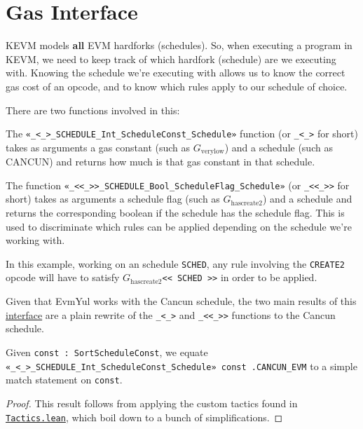 \section{Gas Interface}

KEVM models \textbf{all} EVM hardforks (schedules). So, when executing a program in KEVM, we
need to keep track of which hardfork (schedule) are we executing with.
Knowing the schedule we're executing with allows us to know the correct gas cost
of an opcode, and to know which rules apply to our schedule of choice.

There are two functions involved in this:
\begin{definition}[\texttt{_<_>}]\label{def:gasConstSched}\leanok
The \texttt{«_<_>_SCHEDULE_Int_ScheduleConst_Schedule»} function (or \texttt{_<_>} for
short) takes as arguments a gas constant (such as $G_{\text{verylow}}$) and a
schedule (such as CANCUN) and returns how much is that gas constant in that
schedule.
\end{definition}
\begin{definition}[\texttt{_<<_>>}]\label{def:flagConstSched}\leanok
The function \texttt{«_<<_>>_SCHEDULE_Bool_ScheduleFlag_Schedule»} (or
\texttt{_<<_>>} for short) takes as arguments a schedule flag (such as
$G_{\text{hascreate2}}$) and  a schedule and returns the corresponding boolean
if the schedule has the schedule flag. This is used to discriminate which rules
can be applied depending on the schedule we're working with.

In this example, working on an schedule \texttt{SCHED}, any rule involving the
\texttt{CREATE2} opcode will have to satisfy $G_{\text{hascreate2}}$\texttt{<<
  SCHED >>} in order to be applied.
\end{definition}

Given that EvmYul works with the Cancun schedule, the two main results of this
\href{https://runtimeverification.github.io/evm-equivalence/docs/EvmEquivalence/Interfaces/GasInterface.html}{interface}
are a plain rewrite of the \texttt{_<_>} and \texttt{_<<_>>} functions to the
Cancun schedule.

\begin{theorem}
\label{thm:cancun_def}\leanok{}
Given \texttt{const : SortScheduleConst}, we equate
\texttt{«_<_>_SCHEDULE_Int_ScheduleConst_Schedule» const .CANCUN_EVM} to a
simple match statement on \texttt{const}.
\end{theorem}
\begin{proof}
\leanok
This result follows from applying the custom tactics found in
\href{https://runtimeverification.github.io/evm-equivalence/docs/EvmEquivalence/Interfaces/Tactics.html}{\texttt{Tactics.lean}},
which boil down to a bunch of simplifications.
\end{proof}


